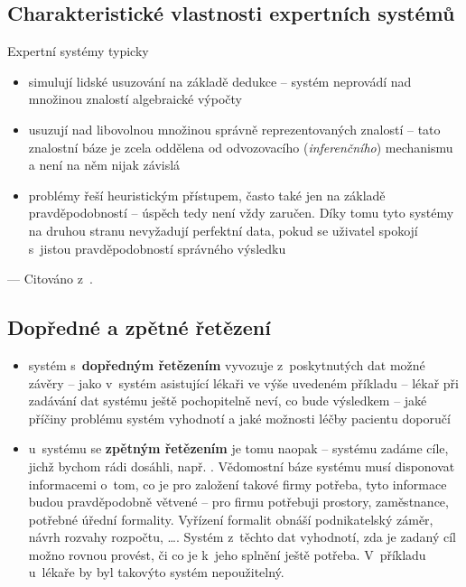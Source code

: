 \subsection{Charakteristické vlastnosti expertních systémů}
Expertní systémy typicky
\begin{itemize}
\item simulují lidské usuzování na základě dedukce
  -- systém neprovádí nad množinou znalostí algebraické výpočty
\item usuzují nad libovolnou množinou správně reprezentovaných znalostí
  -- tato znalostní báze je zcela oddělena od odvozovacího (\emph
  {inferenčního}) mechanismu a není na něm nijak závislá
\item problémy řeší heuristickým přístupem, často také jen na
  základě pravděpodobností -- úspěch tedy není vždy zaručen. Díky tomu tyto
  systémy na druhou stranu nevyžadují perfektní data, pokud se uživatel
  spokojí s~jistou pravděpodobností správného výsledku
\end{itemize}
--- Citováno z~\cite{introduction}.
\subsection{Dopředné a zpětné řetězení}
\begin{itemize}
\item systém s~\textbf{dopředným řetězením} vyvozuje z~poskytnutých dat možné
závěry -- jako v~systém asistující lékaři ve výše uvedeném příkladu --
lékař při zadávání dat systému ještě pochopitelně neví, co bude výsledkem
-- jaké příčiny problému systém vyhodnotí a jaké možnosti léčby pacientu doporučí
\item u~systému se \textbf{zpětným řetězením} je tomu naopak -- systému
zadáme cíle, jichž bychom rádi dosáhli, např. . Vědomostní báze systému musí disponovat informacemi o~tom, co je
pro založení takové firmy potřeba, tyto informace budou pravděpodobně větvené
-- pro firmu potřebuji prostory, zaměstnance, potřebné úřední formality.
Vyřízení formalit obnáší podnikatelský záměr, návrh rozvahy rozpočtu, \ldots.
Systém z~těchto dat vyhodnotí, zda je zadaný cíl možno rovnou provést, či
co je k~jeho splnění ještě potřeba. V~příkladu u~lékaře by byl takovýto
systém nepoužitelný.
\end{itemize}

